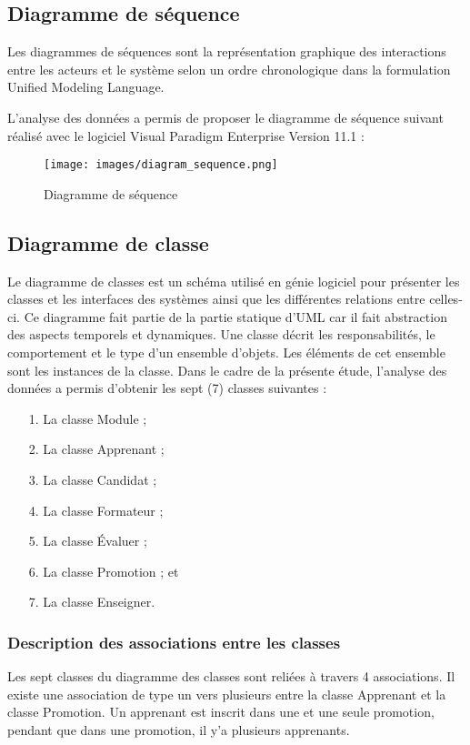 		
\subsection{Diagramme de séquence}

Les diagrammes de séquences sont la représentation graphique des interactions entre les acteurs et le système selon un ordre chronologique dans la formulation Unified Modeling Language.

L’analyse des données a permis de proposer le diagramme de séquence suivant réalisé avec le logiciel Visual Paradigm Enterprise Version 11.1 :

\begin{figure}[H]
\begin{center}
	\texttt{[image: images/diagram\_sequence.png]}
	\caption{Diagramme de séquence}
\end{center}
\end{figure}

\subsection{Diagramme de classe}

Le diagramme de classes est un schéma utilisé en génie logiciel pour présenter les classes et les interfaces des systèmes ainsi que les différentes relations entre celles-ci. Ce diagramme fait partie de la partie statique d'UML car il fait abstraction des aspects temporels et dynamiques.
Une classe décrit les responsabilités, le comportement et le type d'un ensemble d'objets. Les éléments de cet ensemble sont les instances de la classe.
Dans le cadre de la présente étude, l'analyse des données a permis d'obtenir les sept (7) classes suivantes :
\begin{itemize}
	\item[1.]La classe Module ;
	\item[2.]La classe Apprenant ;
	\item[3.]La classe Candidat ;
	\item[4.]La classe Formateur ; 
	\item[5.]La classe Évaluer ; 
	\item[6.]La classe Promotion ; et 
	\item[7.]La classe Enseigner.
\end{itemize}
 
\subsubsection{Description des associations entre les classes}
Les sept classes du diagramme des classes sont reliées à travers 4 associations.
Il existe une association de type un vers plusieurs entre la classe Apprenant et la classe Promotion.  Un apprenant est inscrit dans une et une seule promotion, pendant que dans une promotion, il y'a plusieurs apprenants. 
